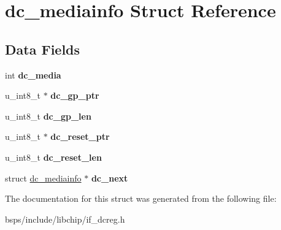 \hypertarget{structdc__mediainfo}{}\section{dc\+\_\+mediainfo Struct Reference}
\label{structdc__mediainfo}
\subsection*{Data Fields}
\begin{DoxyCompactItemize}
\item 
\mbox{\label{structdc__mediainfo_a4c2082a257a64688592348a7615b232c}} 
int {\bfseries dc\+\_\+media}
\item 
\mbox{\label{structdc__mediainfo_ad3d48a1518e1ab574b37c220c9377f3d}} 
u\+\_\+int8\+\_\+t $\ast$ {\bfseries dc\+\_\+gp\+\_\+ptr}
\item 
\mbox{\label{structdc__mediainfo_aa5a541b487d80133e416cfdc8ec9676d}} 
u\+\_\+int8\+\_\+t {\bfseries dc\+\_\+gp\+\_\+len}
\item 
\mbox{\label{structdc__mediainfo_a3b2aead7fb9e8071a47befdb297c61ee}} 
u\+\_\+int8\+\_\+t $\ast$ {\bfseries dc\+\_\+reset\+\_\+ptr}
\item 
\mbox{\label{structdc__mediainfo_a2a7899695292b64a8d6566ad7779c480}} 
u\+\_\+int8\+\_\+t {\bfseries dc\+\_\+reset\+\_\+len}
\item 
\mbox{\label{structdc__mediainfo_a8daf7f9719e3293e63a953c30e2b9f37}} 
struct \mbox{\hyperlink{structdc__mediainfo}{dc\+\_\+mediainfo}} $\ast$ {\bfseries dc\+\_\+next}
\end{DoxyCompactItemize}


The documentation for this struct was generated from the following file\+:\begin{DoxyCompactItemize}
\item 
bsps/include/libchip/if\+\_\+dcreg.\+h\end{DoxyCompactItemize}

